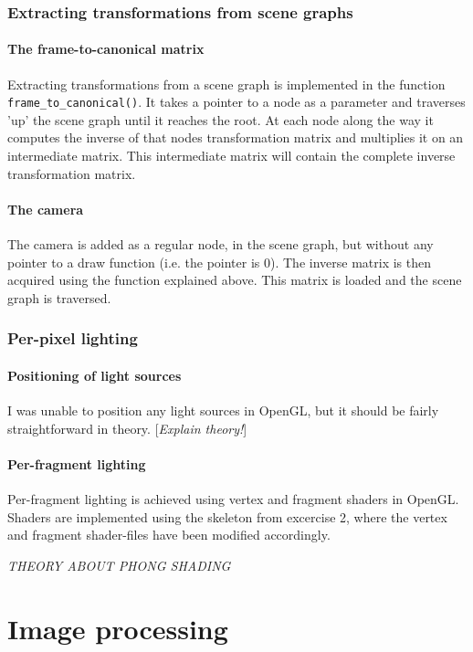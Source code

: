 \documentclass[10pt,a4paper]{article}
\begin{document}
\section{Extracting transformations from scene graphs}

\subsection{The frame-to-canonical matrix}
Extracting transformations from a scene graph is implemented in the function \texttt{frame\_to\_canonical()}. It takes a pointer to a node as a parameter and traverses 'up' the scene graph until it reaches the root. At each node along the way it computes the inverse of that nodes transformation matrix and multiplies it on an intermediate matrix. This intermediate matrix will contain the complete inverse transformation matrix.

\subsection{The camera}
The camera is added as a regular node, in the scene graph, but without any pointer to a draw function (i.e. the pointer is 0). The inverse matrix is then acquired using the  function explained above. This matrix is loaded and the scene graph is traversed.


\section{Per-pixel lighting}

\subsection{Positioning of light sources}
I was unable to position any light sources in OpenGL, but it should be fairly straightforward in theory. [\textit{Explain theory!}]

\subsection{Per-fragment lighting}
Per-fragment lighting is achieved using vertex and fragment shaders in OpenGL. Shaders are implemented using the skeleton from excercise 2, where the vertex and fragment shader-files have been modified accordingly.

\textit{THEORY ABOUT PHONG SHADING}

\part{Image processing}
\end{document}
